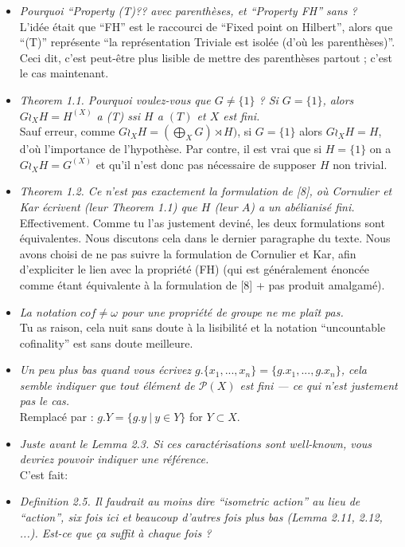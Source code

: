 \documentclass[a4paper]{article}
\theoremstyle{definition}
\newcommand{\setst}[2]{\{#1\ |\ #2\}}
\begin{document}
\begin{itemize}
\item
\textit{Pourquoi ``Property (T)?? avec parenthèses, et ``Property FH'' sans ?}\\
L'idée était que ``FH'' est le raccourci de ``Fixed point on Hilbert'', alors que ``(T)'' représente ``la représentation Triviale est isolée (d'où les parenthèses)''. Ceci dit, c'est peut-être plus lisible de mettre des parenthèses partout ; c'est le cas maintenant.
\item
\textit{Theorem 1.1. Pourquoi voulez-vous que $G\neq\{1\}$ ? Si $G = \{1\}$, alors $G\wr_XH = H^{(X)}$ a (T) ssi $H$ a $(T)$ et $X$  est fini.}\\
Sauf erreur, comme $G\wr_XH=(\bigoplus_X G)\rtimes H)$, si $G = \{1\}$ alors $G\wr_XH=H$, d'où l'importance de l'hypothèse. Par contre, il est vrai que si $H=\{1\}$ on a $G\wr_XH=G^{(X)}$ et qu'il n'est donc pas nécessaire de supposer $H$ non trivial.
\item
\textit{Theorem 1.2. Ce n’est pas exactement la formulation de [8], où Cornulier et Kar écrivent (leur Theorem 1.1) que $H$ (leur $A$) a un abélianisé fini.}\\
Effectivement. Comme tu l'as justement deviné, les deux formulations sont équivalentes. Nous discutons cela dans le dernier paragraphe du texte. Nous avons choisi de ne pas suivre la formulation de Cornulier et Kar, afin d'expliciter le lien avec la propriété (FH) (qui est généralement énoncée comme étant équivalente à la formulation de [8] + pas produit amalgamé).
\item
\textit{La notation $cof\neq\omega$ pour une propriété de groupe ne me plaît pas.}\\
Tu as raison, cela nuit sans doute à la lisibilité et la notation ``uncountable cofinality'' est sans doute meilleure.
\item
\textit{Un peu plus bas quand vous écrivez $g.\{x_1,...,x_n\} = \{g.x_1,...,g.x_n\}$, cela semble indiquer que tout élément de $\mathcal P(X)$ est fini --- ce qui n’est justement pas le cas.}\\
Remplacé par : $g.Y=\setst{g.y}{y\in Y}$ for $Y\subset X$.
\item
\textit{Juste avant le Lemma 2.3. Si ces caractérisations sont well-known, vous devriez pouvoir indiquer une référence.}\\
C'est fait: \cite{MR2240370}
\item
\textit{
Definition 2.5. Il faudrait au moins dire “isometric action” au lieu de “action”, six fois ici et beaucoup d’autres fois plus bas (Lemma 2.11, 2.12, ...). Est-ce que ça suffit à chaque fois ?}\\

\end{itemize}
\end{document}
